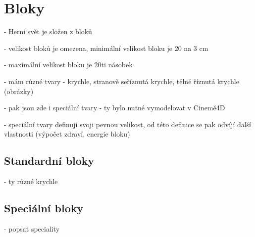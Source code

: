 
\section{Bloky}

- Herní svět je složen z bloků

- velikost bloků je omezena, minimální velikost bloku je 20 na 3 cm

- maximální velikost bloku je 20ti násobek

- mám různé tvary - krychle, stranově seříznutá krychle, tělně říznutá krychle (obrázky)


- pak jsou zde i speciální tvary - ty bylo nutné vymodelovat v Cinemě4D


- speciální tvary definují svoji pevnou velikost, od této definice se pak odvíjí další vlastnosti (výpočet zdraví, energie bloku)




\subsection{Standardní bloky}
- ty různé krychle

\subsection{Speciální bloky}
- popsat speciality

